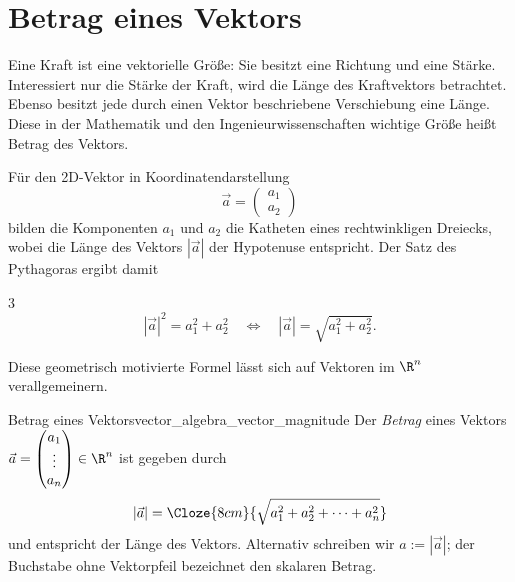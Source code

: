 \section{Betrag eines Vektors}
\label{sec:vector_algebra_magnitude}

Eine Kraft ist eine vektorielle Größe: Sie besitzt eine Richtung und eine
Stärke. Interessiert nur die Stärke der Kraft, wird die Länge des
Kraftvektors betrachtet. Ebenso besitzt jede durch einen Vektor beschriebene
Verschiebung eine Länge. Diese in der Mathematik und den
Ingenieurwissenschaften wichtige Größe heißt Betrag des Vektors.

\noindent
\begin{minipage}[c]{0.56\linewidth}
  Für den 2D-Vektor in Koordinatendarstellung
  \[
    \vec a=\begin{pmatrix}a_1\\a_2\end{pmatrix}
  \]
  bilden die Komponenten $a_1$ und $a_2$ die Katheten eines rechtwinkligen
  Dreiecks, wobei die Länge des Vektors $|\vec a|$ der Hypotenuse entspricht.
  Der Satz des Pythagoras ergibt damit 
  \begin{ClozeArea}[16]{3}
    \[
      |\vec a|^2=a_1^2+a_2^2
      \quad\Longleftrightarrow\quad
      |\vec a|=\sqrt{a_1^2+a_2^2}.
    \]
  \end{ClozeArea}
\end{minipage}\hfill
\begin{minipage}[c]{0.38\linewidth}
  \centering
\end{minipage}\par
\vspace{0.6em}
\noindent
Diese geometrisch motivierte Formel lässt sich auf Vektoren im $\R^n$
verallgemeinern.

\begin{DefinitionBox}{Betrag eines Vektors}{vector_algebra_vector_magnitude}
  Der \emph{Betrag}  eines Vektors
  $\vec a=\begin{pmatrix}a_1\\\vdots\\a_n\end{pmatrix}\in\R^n$ ist gegeben durch
  \[
    |\vec a| = \Cloze{8cm}{\sqrt{a_1^2+a_2^2+\dots+a_n^2}}
  \]
  und entspricht der Länge des Vektors.
  Alternativ schreiben wir $a:=|\vec a|$; der Buchstabe ohne Vektorpfeil
  bezeichnet den skalaren Betrag.
\end{DefinitionBox}


